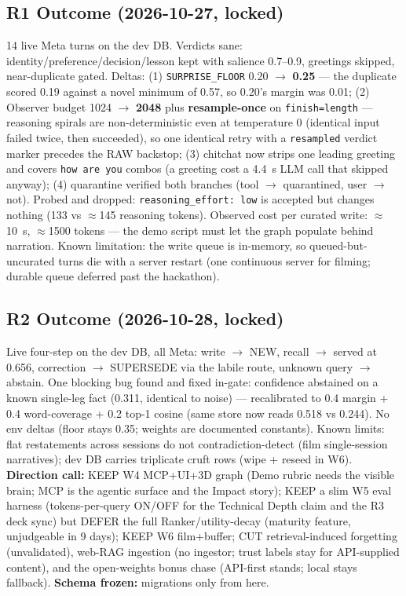 \subsection{R1 Outcome (2026-10-27, locked)}
14 live Meta turns on the dev DB. Verdicts sane: identity/preference/decision/lesson kept with
salience 0.7--0.9, greetings skipped, near-duplicate gated. Deltas: (1)
\texttt{SURPRISE\_FLOOR} 0.20 $\rightarrow$ \textbf{0.25} --- the duplicate scored 0.19 against a
novel minimum of 0.57, so 0.20's margin was 0.01; (2) Observer budget 1024 $\rightarrow$
\textbf{2048} plus \textbf{resample-once} on \texttt{finish=length} --- reasoning spirals are
non-deterministic even at temperature 0 (identical input failed twice, then succeeded), so one
identical retry with a \texttt{resampled} verdict marker precedes the RAW backstop; (3) chitchat
now strips one leading greeting and covers \texttt{how are you} combos (a greeting cost a 4.4~s
LLM call that skipped anyway); (4) quarantine verified both branches (tool $\rightarrow$
quarantined, user $\rightarrow$ not). Probed and dropped: \texttt{reasoning\_effort: low} is
accepted but changes nothing (133 vs $\approx$145 reasoning tokens). Observed cost per curated
write: $\approx$10~s, $\approx$1500 tokens --- the demo script must let the graph populate behind
narration. Known limitation: the write queue is in-memory, so queued-but-uncurated turns die with
a server restart (one continuous server for filming; durable queue deferred past the hackathon).

\subsection{R2 Outcome (2026-10-28, locked)}
Live four-step on the dev DB, all Meta: write $\rightarrow$ NEW, recall $\rightarrow$ served at
0.656, correction $\rightarrow$ SUPERSEDE via the labile route, unknown query $\rightarrow$ abstain.
One blocking bug found and fixed in-gate: confidence abstained on a known single-leg fact
(0.311, identical to noise) --- recalibrated to 0.4 margin + 0.4 word-coverage + 0.2 top-1 cosine
(same store now reads 0.518 vs 0.244). No env deltas (floor stays 0.35; weights are documented
constants). Known limits: flat restatements across sessions do not contradiction-detect (film
single-session narratives); dev DB carries triplicate cruft rows (wipe + reseed in W6).
\textbf{Direction call:} KEEP W4 MCP+UI+3D graph (Demo rubric needs the visible brain; MCP is the
agentic surface and the Impact story); KEEP a slim W5 eval harness (tokens-per-query ON/OFF for
the Technical Depth claim and the R3 deck sync) but DEFER the full Ranker/utility-decay (maturity
feature, unjudgeable in 9 days); KEEP W6 film+buffer; CUT retrieval-induced forgetting
(unvalidated), web-RAG ingestion (no ingestor; trust labels stay for API-supplied content), and
the open-weights bonus chase (API-first stands; local stays fallback). \textbf{Schema frozen:}
migrations only from here.

